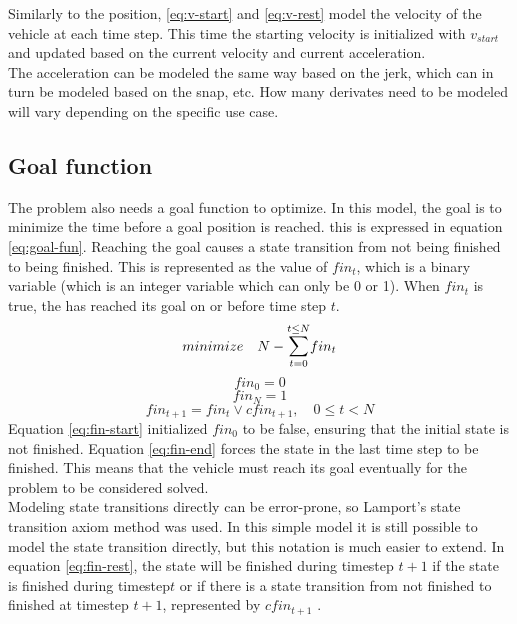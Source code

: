 Similarly to the position, \ref{eq:v-start} and \ref{eq:v-rest} model the velocity of the vehicle at each time step. This time the starting velocity is initialized with $v_{start}$ and updated based on the current velocity and current acceleration.\\
The acceleration can be modeled the same way based on the jerk, which can in turn be modeled based on the snap, etc. How many derivates need to be modeled will vary depending on the specific use case.

\subsection{Goal function}
The problem also needs a goal function to optimize. In this model, the goal is to minimize the time before a goal position is reached. this is expressed in equation \ref{eq:goal-fun}. Reaching the goal causes a state transition from not being finished to being finished. This is represented as the value of $fin_t$, which is a binary variable (which is an integer variable which can only be 0 or 1). When $fin_t$ is true, the has reached its goal on or before time step $t$.
\begin{equation}
\label{eq:goal-fun}
minimize \quad N - \mathlarger{\sum}_{t=0}^{t \leq N} fin_t
\end{equation}
\begin{equation}
\label{eq:fin-start}
fin_0 = 0
\end{equation}
\begin{equation}
\label{eq:fin-end}
fin_{N} = 1
\end{equation}
\begin{equation}
\label{eq:fin-rest}
fin_{t+1} = fin_t \vee cfin_{t+1},  \quad 0 \leq t < N
\end{equation}
Equation \ref{eq:fin-start} initialized $fin_0$ to be false, ensuring that the initial state is not finished. Equation \ref{eq:fin-end} forces the state in the last time step to be finished. This means that the vehicle must reach its goal eventually for the problem to be considered solved. \\
Modeling state transitions directly can be error-prone, so Lamport's\cite{Lamport1989} state transition axiom method was used. In this simple model it is still possible to model the state transition directly, but this notation is much easier to extend. In equation \ref{eq:fin-rest}, the state will be finished during timestep $t+1$ if the state is finished during timestep$t$ or if there is a state transition from not finished to finished at timestep $t + 1$, represented by $cfin_{t+1}$ .

